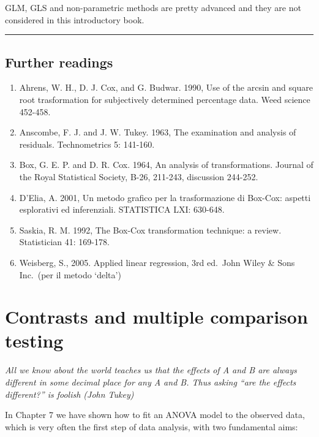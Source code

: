 \documentclass[a4paper,12pt,oneside]{book}
\providecommand{\tightlist}{%
  \setlength{\itemsep}{0pt}\setlength{\parskip}{0pt}}
\begin{document}
GLM, GLS and non-parametric methods are pretty advanced and they are not considered in this introductory book.

\begin{center}\rule{0.5\linewidth}{0.5pt}\end{center}

\hypertarget{further-readings-6}{%
\section{Further readings}\label{further-readings-6}}

\begin{enumerate}
\def\labelenumi{\arabic{enumi}.}
\tightlist
\item
  Ahrens, W. H., D. J. Cox, and G. Budwar. 1990, Use of the arcsin and square root trasformation for subjectively determined percentage data. Weed science 452-458.
\item
  Anscombe, F. J. and J. W. Tukey. 1963, The examination and analysis of residuals. Technometrics 5: 141-160.
\item
  Box, G. E. P. and D. R. Cox. 1964, An analysis of transformations. Journal of the Royal Statistical Society, B-26, 211-243, discussion 244-252.
\item
  D'Elia, A. 2001, Un metodo grafico per la trasformazione di Box-Cox: aspetti esplorativi ed inferenziali. STATISTICA LXI: 630-648.
\item
  Saskia, R. M. 1992, The Box-Cox transformation technique: a review. Statistician 41: 169-178.
\item
  Weisberg, S., 2005. Applied linear regression, 3rd ed.~John Wiley \& Sons Inc.~(per il metodo `delta')
\end{enumerate}

\hypertarget{contrasts-and-multiple-comparison-testing}{%
\chapter{Contrasts and multiple comparison testing}\label{contrasts-and-multiple-comparison-testing}}

\emph{All we know about the world teaches us that the effects of A and B are always different in some decimal place for any A and B. Thus asking ``are the effects different?'' is foolish (John Tukey)}

In Chapter 7 we have shown how to fit an ANOVA model to the observed data, which is very often the first step of data analysis, with two fundamental aims:
\end{document}
